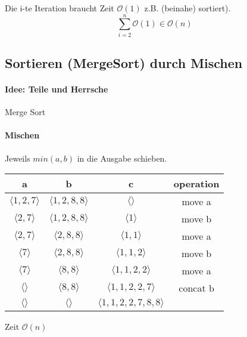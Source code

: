 \documentclass[a4paper]{scrartcl}
\begin{document}
	Die i-te Iteration braucht Zeit \( \mathcal{O}(1) \) z.B. (beinahe) sortiert).
	\[ \sum_{i=2}^{n} \mathcal{O}(1) \in \mathcal{O}(n) \]
	
	\subsection{Sortieren (MergeSort) durch Mischen } 
	\paragraph{Idee: Teile und Herrsche}
	
	\begin{algorithm}[H]
		\caption{Merge Sort}
		\DontPrintSemicolon
	
	\end{algorithm}
	
	
	
	\paragraph{Mischen} 
	Jeweils \( min(a, b) \) in die Ausgabe schieben.
	
	\begin{table}[H]
		\centering
		\begin{tabular}{|c c|c c|}
			\hline
			a&b&c&operation\\
			\hline
			\( \langle 1, 2, 7 \rangle \) & \( \langle 1, 2, 8, 8  \rangle \) &\( \langle   \rangle \) & move a \\
			\( \langle 2, 7 \rangle \) & \( \langle 1, 2, 8, 8  \rangle \) &\( \langle 1  \rangle \) & move  b \\
			\( \langle 2, 7 \rangle \) & \( \langle 2, 8, 8  \rangle \) &\( \langle 1, 1  \rangle \) & move a \\
			\( \langle 7 \rangle \) & \( \langle 2, 8, 8  \rangle \) &\( \langle 1, 1, 2  \rangle \) & move b\\
			\( \langle 7 \rangle \) & \( \langle  8, 8  \rangle \) &\( \langle 1, 1, 2, 2  \rangle \) & move a \\
			\( \langle  \rangle \) & \( \langle  8, 8  \rangle \) &\( \langle 1, 1, 2, 2 , 7  \rangle \) & concat b \\
			\hline
			\( \langle  \rangle \) & \( \langle  \rangle \) &\( \langle 1, 1, 2, 2 , 7, 8, 8  \rangle \) & \\
			\hline
		\end{tabular}
	\end{table}
	Zeit \( \mathcal{O}(n) \)
	
\end{document}
